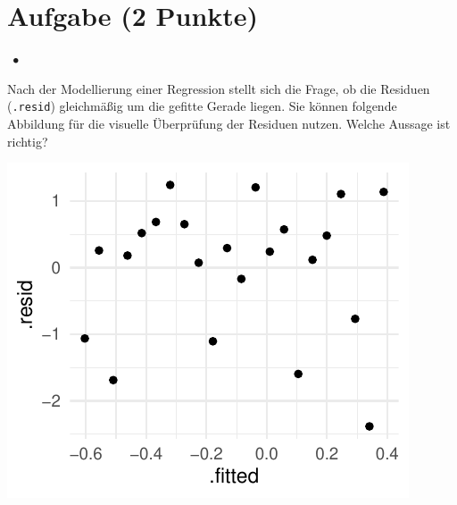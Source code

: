 \documentclass[a4paper, 9pt]{scrartcl}\usepackage[]{graphicx}\usepackage[]{xcolor}
\makeatletter
\def\maxwidth{ %
  \ifdim\Gin@nat@width>\linewidth
    \linewidth
  \else
    \Gin@nat@width
  \fi
}
\makeatother
\begin{document}
\section{Aufgabe \hfill (2 Punkte)}

\ifcollection
\begin{flushright}
\tiny\vspace{-2Ex}
\textbf{\examinhaltstart}
\exammodulestatversuch $\;\bullet$
\exammodulebiostat
\vspace{-1Ex}
\end{flushright}
\fi




Nach der Modellierung einer Regression stellt sich die Frage, ob die Residuen (\texttt{.resid}) gleichmäßig um die gefitte Gerade liegen. Sie können folgende Abbildung für die visuelle Überprüfung der Residuen nutzen. Welche Aussage ist richtig?



{\centering \includegraphics[width=\maxwidth]{img/mc-regression-06-a-1} 

}
\end{document}

